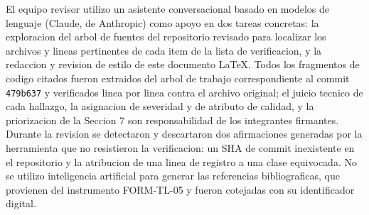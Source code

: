 \documentclass[10pt,a4paper]{article}
\newcommand{\commitCorto}{479b637}
\begin{document}
El equipo revisor utilizo un asistente conversacional basado en modelos de lenguaje
(Claude, de Anthropic) como apoyo en dos tareas concretas: la exploracion del arbol de
fuentes del repositorio revisado para localizar los archivos y lineas pertinentes de cada
item de la lista de verificacion, y la redaccion y revision de estilo de este documento
LaTeX. Todos los fragmentos de codigo citados fueron extraidos del arbol de trabajo
correspondiente al commit \texttt{\commitCorto} y verificados linea por linea contra el
archivo original; el juicio tecnico de cada hallazgo, la asignacion de severidad y de
atributo de calidad, y la priorizacion de la Seccion 7 son responsabilidad de los
integrantes firmantes. Durante la revision se detectaron y descartaron dos afirmaciones
generadas por la herramienta que no resistieron la verificacion: un SHA de commit
inexistente en el repositorio y la atribucion de una linea de registro a una clase
equivocada. No se utilizo inteligencia artificial para generar las referencias
bibliograficas, que provienen del instrumento FORM-TL-05 y fueron cotejadas con su
identificador digital.
\end{document}
